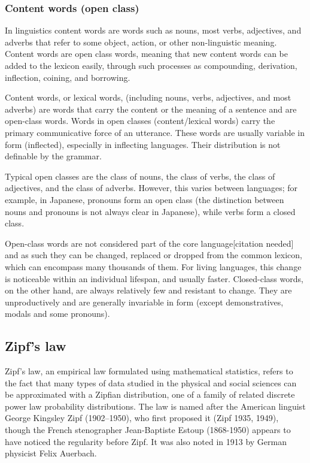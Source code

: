     \subsubsection{Content words (open class)}

      In linguistics content words are words such as nouns, most verbs, adjectives, and adverbs that refer to some object, action, or other non-linguistic meaning. Content words are open class words, meaning that new content words can be added to the lexicon easily, through such processes as compounding, derivation, inflection, coining, and borrowing.
        
      Content words, or lexical words, (including nouns, verbs, adjectives, and most adverbs) are words that carry the content or the meaning of a sentence and are open-class words. Words in open classes (content/lexical words) carry the primary communicative force of an utterance. These words are usually variable in form (inflected), especially in inflecting languages. Their distribution is not definable by the grammar.

      Typical open classes are the class of nouns, the class of verbs, the class of adjectives, and the class of adverbs. However, this varies between languages; for example, in Japanese, pronouns form an open class (the distinction between nouns and pronouns is not always clear in Japanese), while verbs form a closed class.

      Open-class words are not considered part of the core language[citation needed] and as such they can be changed, replaced or dropped from the common lexicon, which can encompass many thousands of them. For living languages, this change is noticeable within an individual lifespan, and usually faster. Closed-class words, on the other hand, are always relatively few and resistant to change. They are unproductively and are generally invariable in form (except demonstratives, modals and some pronouns).
  
  \subsection{Zipf's law}
  
    Zipf's law, an empirical law formulated using mathematical statistics, refers to the fact that many types of data studied in the physical and social sciences can be approximated with a Zipfian distribution, one of a family of related discrete power law probability distributions. The law is named after the American linguist George Kingsley Zipf (1902–1950), who first proposed it (Zipf 1935, 1949), though the French stenographer Jean-Baptiste Estoup (1868-1950) appears to have noticed the regularity before Zipf.\cite{ManningSchutze1999} It was also noted in 1913 by German physicist Felix Auerbach.\cite{Auerbach1913}
    
